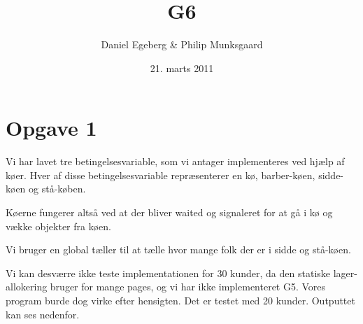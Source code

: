 \documentclass [10pt,a4paper]{article}
\title{G6}
\author{Daniel Egeberg \& Philip Munksgaard}
\date{21. marts 2011}
\begin{document}
\maketitle

\section*{Opgave 1} %

Vi har lavet tre betingelsesvariable, som vi antager implementeres ved
hjælp af køer. Hver af disse betingelsesvariable repræsenterer en kø,
barber-køen, sidde-køen og stå-køben.

Køerne fungerer altså ved at der bliver waited og
signaleret for at gå i kø og vække objekter fra køen.

Vi bruger en global tæller til at tælle hvor mange folk der er i sidde
og stå-køen.

Vi kan desværre ikke teste implementationen for 30 kunder, da den
statiske lager-allokering bruger for mange pages, og vi har ikke
implementeret G5. Vores program burde dog virke efter hensigten. Det
er testet med 20 kunder. Outputtet kan ses nedenfor.
\end{document}
